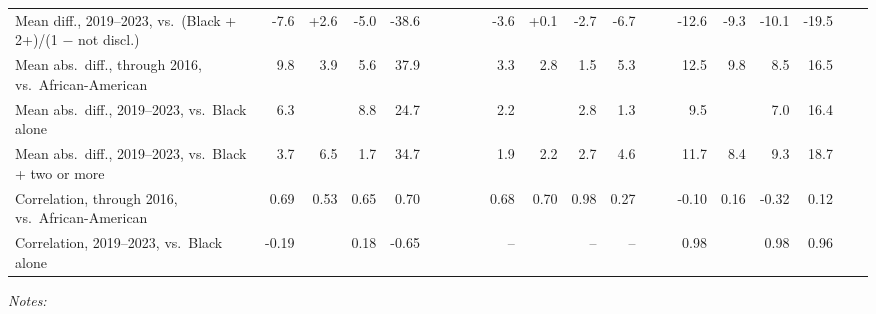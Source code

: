 \begin{table}[!h]
{\begin{threeparttable}
\begin{tabular}[t]{lrrrrrrrrrrrrrrrrrrrr}
\hspace{1em}Mean diff., 2019--2023, vs.\ (Black + 2+)/(1 $-$ not discl.) & -7.6 & +2.6 & -5.0 & -38.6 &  &  &  &  & -3.6 & +0.1 & -2.7 & -6.7 &  &  & -12.6 & -9.3 & -10.1 & -19.5 &  & \\
\hspace{1em}Mean abs.\ diff., through 2016, vs.\ African-American & 9.8 & 3.9 & 5.6 & 37.9 &  &  &  &  & 3.3 & 2.8 & 1.5 & 5.3 &  &  & 12.5 & 9.8 & 8.5 & 16.5 &  & \\
\hspace{1em}Mean abs.\ diff., 2019--2023, vs.\ Black alone & 6.3 &  & 8.8 & 24.7 &  &  &  &  & 2.2 &  & 2.8 & 1.3 &  &  & 9.5 &  & 7.0 & 16.4 &  & \\
\hspace{1em}Mean abs.\ diff., 2019--2023, vs.\ Black + two or more & 3.7 & 6.5 & 1.7 & 34.7 &  &  &  &  & 1.9 & 2.2 & 2.7 & 4.6 &  &  & 11.7 & 8.4 & 9.3 & 18.7 &  & \\
\hspace{1em}Correlation, through 2016, vs.\ African-American & 0.69 & 0.53 & 0.65 & 0.70 &  &  &  &  & 0.68 & 0.70 & 0.98 & 0.27 &  &  & -0.10 & 0.16 & -0.32 & 0.12 &  & \\
\hspace{1em}Correlation, 2019--2023, vs.\ Black alone & -0.19 &  & 0.18 & -0.65 &  &  &  &  & -- &  & -- & -- &  &  & 0.98 &  & 0.98 & 0.96 &  & \\
\bottomrule
\end{tabular}
\begin{tablenotes}[para]
\item \textit{Notes:} 

\end{tablenotes}
\end{threeparttable}}
\end{table}
